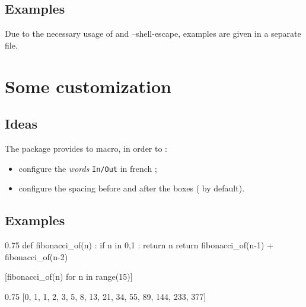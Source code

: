 \documentclass[english,11pt,a4paper]{article}
\begin{document}
\subsection{Examples}

Due to the necessary usage of  and \textsf{--shell-escape}, examples are given in a separate file.

\pagebreak

\section{Some customization}

\subsection{Ideas}

The package provides to macro, in order to :

\begin{itemize}
	\item configure the \textit{words} \texttt{In/Out} in \textsf{french} ;
	\item configure the spacing before and after the boxes ( by default).
\end{itemize}

\begin{codehigh}[language=latex/latex2,style/main=cyan!10,style/code=cyan!10]


\setcounter{JupyterIn}{<nb>} %
\end{codehigh}

\subsection{Examples}

\begin{codehigh}[language=latex/latex2,style/main=cyan!10,style/code=cyan!10]
\SetJupyterParSkip{\baselineskip}
\setcounter{JupyterIn}{14}

\begin{NotebookIn}{0.75\linewidth}
def fibonacci_of(n) :
  if n in {0,1} :
    return n
  return fibonacci_of(n-1) + fibonacci_of(n-2)

[fibonacci_of(n) for n in range(15)]
\end{NotebookIn}

\begin{NotebookOut}{0.75\linewidth}
[0, 1, 1, 2, 3, 5, 8, 13, 21, 34, 55, 89, 144, 233, 377]
\end{NotebookOut}
\end{codehigh}
\end{document}
